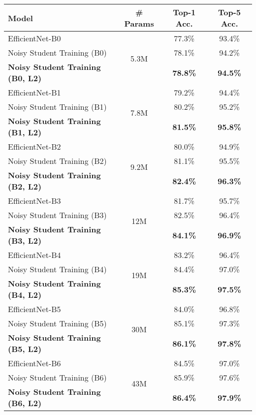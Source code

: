 \documentclass[10pt,twocolumn,letterpaper]{article}
\begin{document}
\begin{table}[h!]
    \centering
    \footnotesize
    \begin{tabular}{l|c|cc}
    \toprule
         Model & \# Params & Top-1 Acc. & Top-5 Acc. \\
         \midrule 
         EfficientNet-B0 & \multirow{3}{*}{5.3M} & 77.3\% & 93.4\%  \\
         Noisy Student Training (B0) & & 78.1\%  & 94.2\% \\
         \bf Noisy Student Training (B0, L2) & & \bf 78.8\%  & \bf 94.5\% \\
         \midrule
         EfficientNet-B1 & \multirow{3}{*}{7.8M} & 79.2\% & 94.4\%  \\
         Noisy Student Training (B1) & & 80.2\% & 95.2\% \\
         \bf Noisy Student Training (B1, L2) & & \bf 81.5\% & \bf 95.8\% \\
         \midrule
         EfficientNet-B2 & \multirow{3}{*}{9.2M} & 80.0\% & 94.9\% \\
         Noisy Student Training (B2) & & 81.1\% & 95.5\% \\
         \bf Noisy Student Training (B2,  L2) & & \bf 82.4\% & \bf 96.3\% \\
         \midrule
         EfficientNet-B3 & \multirow{3}{*}{12M} & 81.7\% & 95.7\%  \\
         Noisy Student Training (B3) & & 82.5\% & 96.4\% \\
         \bf Noisy Student Training (B3, L2) & & \bf 84.1\%  & \bf 96.9\% \\
         \midrule
         EfficientNet-B4 & \multirow{3}{*}{19M} & 83.2\% &  96.4\% \\
         Noisy Student Training (B4) & & 84.4\% & 97.0\%  \\
         \bf Noisy Student Training (B4, L2) & & \bf 85.3\% & \bf 97.5\% \\
         \midrule
         EfficientNet-B5 & \multirow{3}{*}{30M} & 84.0\% & 96.8\%  \\
         Noisy Student Training (B5) & & 85.1\%  & 97.3\% \\
         \bf Noisy Student Training (B5, L2) & & \bf 86.1\% & \bf 97.8\% \\
         \midrule
         EfficientNet-B6 & \multirow{3}{*}{43M} & 84.5\% & 97.0\%  \\
         Noisy Student Training (B6) & & 85.9\% & 97.6\% \\
         \bf Noisy Student Training (B6, L2) & & \bf 86.4\% & \bf 97.9\% \\

\end{tabular}
\end{table}
\end{document}
